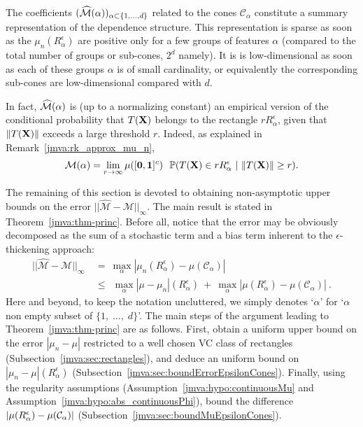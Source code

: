 The coefficients $(\widehat{\mathcal{M}}(\alpha))_{\alpha\subset\{1,\ldots,d\}}$ related to the cones $\mathcal{C}_\alpha$ constitute a summary representation of the dependence structure.  %
This representation is sparse as soon as the $\mu_n(R_\alpha^\epsilon)$ are positive only for a few groups of features $\alpha$ (compared to the total number of groups or sub-cones, $2^d$ namely). It is  is low-dimensional as soon as each of these groups $\alpha$ is of small cardinality, or equivalently the corresponding sub-cones are low-dimensional compared with $d$.

In fact, $\widehat{\mathcal{M}}(\alpha)$ is (up to a normalizing constant) an empirical version of the  conditional probability that $T(\mathbf X)$ belongs to the rectangle $ r R_\alpha^\epsilon$, given that $\|T(\mathbf X)\|$ exceeds  a large threshold $r$. Indeed, as explained in Remark~\ref{jmva:rk_approx_mu_n},  
\begin{align}\label{jmva:eq:interprete_mun_Pcondit}
\mathcal{M}(\alpha) = \lim_{r \to \infty} \mu([\mathbf 0,\mathbf{1}]^c)~~\mathbb{P}(T(\mathbf X)\in r R_\alpha^\epsilon ~|~ \|T(\mathbf X)\|\ge r) . 
\end{align}

The remaining of this section is devoted to obtaining non-asymptotic upper bounds on the error $\vert\vert \widehat{\mathcal{M}}-\mathcal{M}\vert\vert_{\infty}$. 
The main result is stated in Theorem~\ref{jmva:thm-princ}. 
Before all, notice that the error may be obviously decomposed as the sum of a stochastic term and a bias term inherent to the $\epsilon$-thickening approach:
\begin{align}
\vert\vert \widehat{\mathcal{M}}-\mathcal{M}\vert\vert_{\infty} &~=~\max_{\alpha} |
\mu_n(R_\alpha^\epsilon)-\mu(\mathcal{C}_\alpha)|\nonumber
\\&~\le~ ~\max_\alpha |\mu-\mu_n|(R_\alpha^\epsilon) ~+~ \max_\alpha|\mu(R_\alpha^\epsilon)-\mu(\mathcal{C}_\alpha)|~.\label{jmva:error_decomp} 
\end{align}
Here and beyond, to keep the notation uncluttered, we simply denotes `$\alpha$'  for `$\alpha$ non empty subset of $\{1,\; \ldots,\;d\}$'. The main steps of the argument leading to Theorem~\ref{jmva:thm-princ} are  as follows. First, obtain a uniform upper bound on the error $|\mu_n - \mu|$ restricted to a well chosen VC class of rectangles (Subsection~\ref{jmva:sec:rectangles}), and deduce an uniform bound on  $|\mu_n - \mu|(R_\alpha^\epsilon)$ (Subsection~\ref{jmva:sec:boundErrorEpsilonCones}). Finally, using the regularity assumptions (Assumption~\ref{jmva:hypo:continuousMu} and Assumption~\ref{jmva:hypo:abs_continuousPhi}), bound the difference $|\mu(R_\alpha^\epsilon) - \mu(\mathcal{C}_\alpha)|$ (Subsection~\ref{jmva:sec:boundMuEpsilonCones}). 


